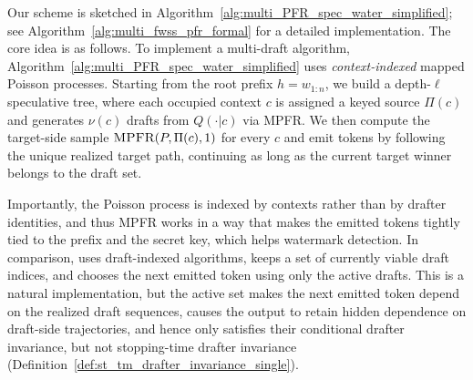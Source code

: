 \documentclass{article}
\theoremstyle{plain}
\theoremstyle{definition}
\begin{document}
Our scheme is %
sketched in Algorithm~\ref{alg:multi_PFR_spec_water_simplified}; see Algorithm~\ref{alg:multi_fwss_pfr_formal} for a detailed implementation. 
The core idea is as follows. 
To implement a multi-draft algorithm, Algorithm~\ref{alg:multi_PFR_spec_water_simplified} uses \emph{context-indexed} mapped Poisson processes.
Starting from the root prefix $h=w_{1:n}$, we build a depth-$\ell$ speculative tree, where each occupied context $c$ is assigned a keyed source $\Pi(c)$ and generates $\nu(c)$ drafts from $Q(\cdot |  c)$ via MPFR.
We then compute the target-side sample $\textsc{MPFR}(P,\Pi(c),1)$ for every $c$ and emit tokens by following the unique realized target path, continuing as long as the current target winner belongs to the draft set. 


Importantly, the Poisson process is indexed by contexts rather than by drafter identities, and thus MPFR works in a way that makes the emitted tokens tightly tied to the prefix and the secret key, which helps watermark detection.
In comparison, \citep{rowan2025list} uses draft-indexed algorithms, keeps a set of currently viable draft indices, and chooses the next emitted token using only the active drafts.
This is a natural implementation, but the active set makes the next emitted token depend on the realized draft sequences, causes the output to retain hidden dependence on draft-side trajectories, and hence only satisfies their conditional drafter invariance, but not stopping-time drafter invariance (Definition~\ref{def:st_tm_drafter_invariance_single}).
\end{document}
